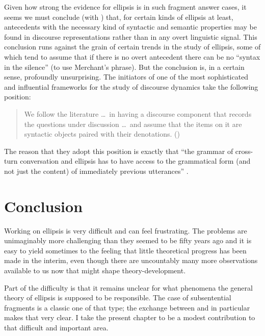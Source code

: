 \documentclass[output=paper,colorlinks,citecolor=brown]{langscibook}
\begin{document}
Given how strong the evidence for ellipsis is in such fragment answer cases, it seems we must conclude (with \cite[Section 5]{merchant:04}) that, for certain kinds of ellipsis at least, antecedents with the necessary kind of syntactic and semantic properties may be found in discourse representations rather than in any overt linguistic signal. This conclusion runs against the grain of certain trends in the study of ellipsis, some of which tend to assume that if there is no overt antecedent there can be no “syntax in the silence” (to use Merchant's phrase). But the conclusion is, in a certain sense, profoundly unsurprising. The initiators of one of the most sophisticated and influential frameworks for the study of discourse dynamics \citet{farkas-bruce:10} take the following position:

\begin{quote}
We follow the literature \ldots\ in having a discourse component that records the questions under discussion \ldots\ and assume that the items on it are syntactic objects paired with their denotations. ({\cite[86]{farkas-bruce:10})}
\end{quote}  

\noindent The reason that they adopt this position is exactly that “the grammar of cross-turn conversation and ellipsis has to have access to the grammatical form (and not just the content) of immediately previous utterances” \citep[86]{farkas-bruce:10}.

\section{Conclusion}
\label{sec:finit}

Working on ellipsis is very difficult and can feel frustrating. The problems are unimaginably more challenging than they seemed to be fifty years ago and it is easy to yield sometimes to the feeling that little theoretical progress has been made in the interim, even though there are uncountably many more observations available to us now that might shape theory\hyp development.

Part of the difficulty is that it remains unclear for what phenomena the general theory of ellipsis is supposed to be responsible. The case of subsentential fragments is a classic one of that type; the exchange between \citet{stainton:06} and \citet{merchant:10} in particular makes that very clear. I take the present chapter to be a modest contribution to that difficult and important area.
\end{document}
